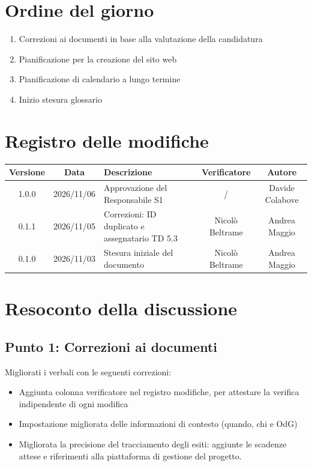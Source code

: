 \documentclass[a4paper, 11pt]{article}
\begin{document}
\section*{Ordine del giorno}
\begin{enumerate}
    \item Correzioni ai documenti in base alla valutazione della candidatura\vspace{-0.2cm}
    \item Pianificazione per la creazione del sito web\vspace{-0.2cm}
    \item Pianificazione di calendario a lungo termine\vspace{-0.2cm}
    \item Inizio stesura glossario\vspace{-0.2cm}
\end{enumerate}
\vspace{-0.5cm}

\section*{Registro delle modifiche}
\begin{tabularx}{\textwidth}{|c|c|X|c|c|}
    \hline
    \textbf{Versione} & \textbf{Data} & \textbf{Descrizione} & \textbf{Verificatore} & \textbf{Autore} \\ \hline
    1.0.0 & 2026/11/06 & Approvazione del Responsabile S1 & / & Davide Colabove \\ \hline
    0.1.1 & 2026/11/05 & Correzioni: ID duplicato e assegnatario TD 5.3 & Nicolò Beltrame & Andrea Maggio \\ \hline
    0.1.0 & 2026/11/03 & Stesura iniziale del documento & Nicolò Beltrame & Andrea Maggio \\ \hline
\end{tabularx}

\newpage
\tableofcontents
\newpage


\section{Resoconto della discussione}

\subsection{Punto 1: Correzioni ai documenti}
Migliorati i verbali con le seguenti correzioni:
\begin{itemize}
    \item Aggiunta colonna verificatore nel registro modifiche, per attestare la verifica indipendente di ogni modifica\vspace{-0.2cm}
    \item Impostazione migliorata delle informazioni di contesto (quando, chi e OdG)\vspace{-0.2cm}
    \item Migliorata la precisione del tracciamento degli esiti: aggiunte le scadenze attese e riferimenti alla piattaforma di gestione del progetto.\vspace{-0.2cm}
\end{itemize}
\end{document}
